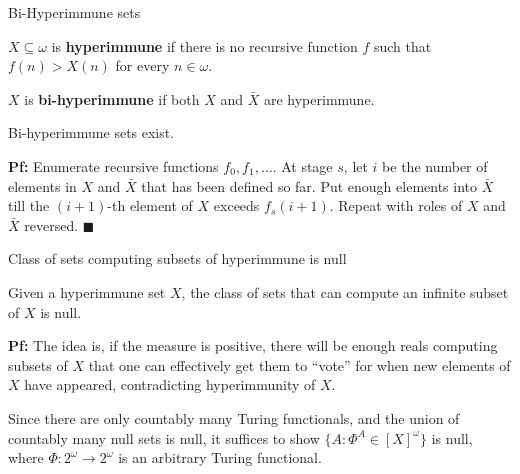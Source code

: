 \begin{frame}{Bi-Hyperimmune sets}
  \begin{define}
    $X\subseteq\omega$ is \textbf{hyperimmune} if there is no recursive
    function $f$ such that $f(n)>X(n)$ for every $n\in\omega$.
  \end{define}

  \begin{define}
    $X$ is \textbf{bi-hyperimmune} if both $X$ and $\bar{X}$ are hyperimmune.
  \end{define}

  \begin{thm}
    Bi-hyperimmune sets exist.
  \end{thm}

  \vspace{0.5em}
  \textbf{Pf:} Enumerate recursive functions $f_0,f_1,\ldots$. At stage
  $s$, let $i$ be the number of elements in $X$ and $\bar{X}$ that has been
  defined so far. Put enough elements into $\bar{X}$ till the $(i+1)$-th
  element of $X$ exceeds $f_s(i+1)$. Repeat with roles of $X$ and $\bar{X}$
  reversed. $\blacksquare$
\end{frame}

\begin{frame}{Class of sets computing subsets of hyperimmune is null}
  \begin{thm}
    \label{thm:bihyper-null}
    Given a hyperimmune set $X$, the class of sets that can compute an
    infinite subset of $X$ is null.
  \end{thm}

  \vspace{1em}
  \textbf{Pf:} The idea is, if the measure is positive, there will be
  enough reals computing subsets of $X$ that one can effectively get them
  to ``vote'' for when new elements of $X$ have appeared, contradicting
  hyperimmunity of $X$.

  \vspace{1em}
  Since there are only countably many Turing functionals, and the union of
  countably many null sets is null, it suffices to show $\{A:
  \Phi^A\in[X]^\omega\}$ is null, where
  $\Phi:2^\omega\rightarrow2^\omega$ is an arbitrary Turing functional.
\end{frame}

